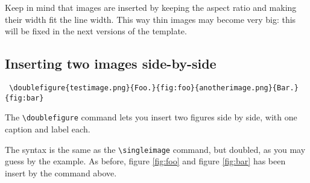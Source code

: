 Keep in mind that images are inserted by keeping the aspect ratio and making their 
width fit the line width. 
This way thin images may become very big: 
this will be fixed in the next versions of the template. 
\subsection{Inserting two images side-by-side}
\begin{verbatim}
 \doublefigure{testimage.png}{Foo.}{fig:foo}{anotherimage.png}{Bar.}{fig:bar}
\end{verbatim}
The \verb!\doublefigure! command lets you insert two figures side by side, with one caption and label each.

The syntax is the same as the \verb!\singleimage! command, but doubled, as you may guess by the example. 
As before, figure \ref{fig:foo} and figure \ref{fig:bar} has been insert by the command above.




